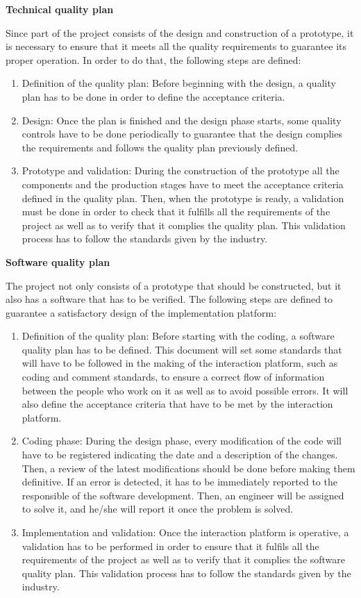 \textbf{Technical quality plan}

Since part of the project consists of the design and construction of a prototype, it is necessary to ensure that it meets all the quality requirements to guarantee its proper operation. In order to do that, the following steps are defined:
\begin{enumerate}
	\item Definition of the quality plan: Before beginning with the design, a quality plan has to be done in order to define the acceptance criteria.
	\item Design: Once the plan is finished and the design phase starts, some quality controls have to be done periodically to guarantee that the design complies the requirements and follows the quality plan previously defined.
	\item Prototype and validation: During the construction of the prototype all the components and the production stages have to meet the acceptance criteria defined in the quality plan. Then, when the prototype is ready, a validation must be done in order to check that it fulfills all the requirements of the project as well as to verify that it complies the quality plan. This validation process has to follow the standards given by the industry.
\end{enumerate}

\textbf{Software quality plan}

The project not only consists of a prototype that should be constructed, but it also has a software that has to be verified. The following steps are defined to guarantee a satisfactory design of the implementation platform:
\begin{enumerate}
	\item Definition of the quality plan: Before starting with the coding, a software quality plan has to be defined. This document will set some standards that will have to be followed in the making of the interaction platform, such as coding and comment standards, to ensure a correct flow of information between the people who work on it as well as to avoid possible errors. It will also define the acceptance criteria that have to be met by the interaction platform.
	\item Coding phase: During the design phase, every modification of the code will have to be registered indicating the date and a description of the changes. Then, a review of the latest modifications should be done before making them definitive.	If an error is detected, it has to be immediately reported to the responsible of the software development. Then, an engineer will be assigned to solve it, and he/she will report it once the problem is solved.
	\item Implementation and validation: Once the interaction platform is operative, a validation has to be performed in order to ensure that it fulfils all the requirements of the project as well as to verify that it complies the software quality plan. This validation process has to follow the standards given by the industry.
\end{enumerate}